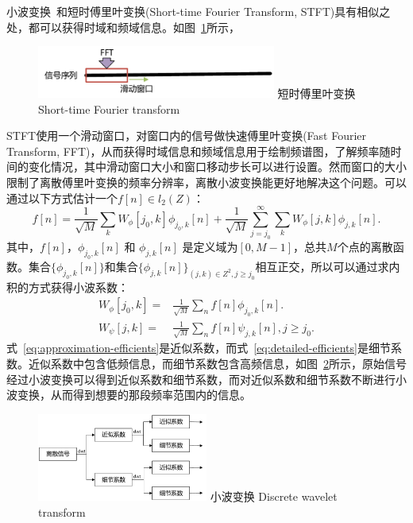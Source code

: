 小波变换~\cite{chun2010tutorial}和短时傅里叶变换(Short-time Fourier Transform, STFT)具有相似之处，都可以获得时域和频域信息。如图~\ref{fig:stft}所示，
\begin{figure}[!htp]
  \centering
  \includegraphics[width=0.7\textwidth]{figure/stft.pdf}
  \bicaption
    {短时傅里叶变换}
    {Short-time Fourier transform}
  \label{fig:stft}
\end{figure}
STFT使用一个滑动窗口，对窗口内的信号做快速傅里叶变换(Fast Fourier Transform, FFT)，从而获得时域信息和频域信息用于绘制频谱图，了解频率随时间的变化情况，其中滑动窗口大小和窗口移动步长可以进行设置。然而窗口的大小限制了离散傅里叶变换的频率分辨率，离散小波变换能更好地解决这个问题。可以通过以下方式估计一个$f[n] \in l_{2}(Z)$：
\begin{equation}
f[n] = \frac{1}{\sqrt{M}}\sum_{k} W_{\phi}[j_{0},k]\phi_{j_{0},k}[n] + \frac{1}{\sqrt{M}}\sum_{j=j_{0}}^{\infty}\sum_{k}W_{\phi}[j,k]\phi_{j,k}[n].
\end{equation}
其中，$f[n]$，$\phi_{j_{0},k}[n]$ 和 $\phi_{j,k}[n]$ 是定义域为$[0,M-1]$，总共$M$个点的离散函数。集合$\{\phi_{j_{0},k}[n]\}$和集合$\{\phi_{j,k}[n]\}_{(j,k)\in Z^{2}, j \geq j_{0}}$相互正交，所以可以通过求内积的方式获得小波系数：
\begin{align}
W_{\phi}[j_{0},k]=&\frac{1}{\sqrt{M}}\sum_{n}f[n]\phi_{j_{0},k}[n]. \label{eq:approximation-efficients} \\
W_{\psi}[j,k] =& \frac{1}{\sqrt{M}}\sum_{n}f[n]\psi_{j,k}[n],  j \geq j_{0}. \label{eq:detailed-efficients}
\end{align}
式~\ref{eq:approximation-efficients}是近似系数，而式~\ref{eq:detailed-efficients}是细节系数。近似系数中包含低频信息，而细节系数包含高频信息，如图~\ref{fig:dwt}所示，原始信号经过小波变换可以得到近似系数和细节系数，而对近似系数和细节系数不断进行小波变换，从而得到想要的那段频率范围内的信息。
\begin{figure}[!htp]
  \centering
  \includegraphics[width=0.5\textwidth]{figure/dwt.pdf}
  \bicaption
    {小波变换}
    {Discrete wavelet transform}
  \label{fig:dwt}
\end{figure}

